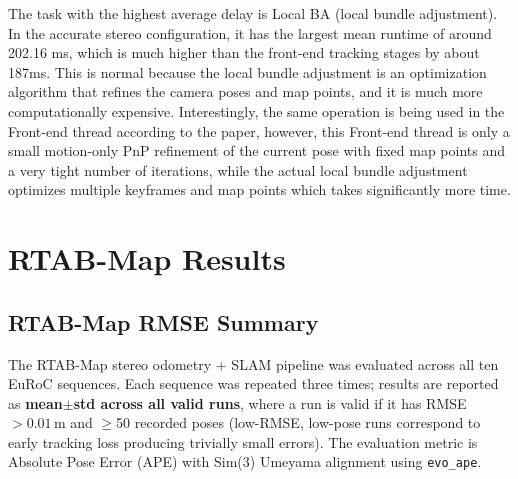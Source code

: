 \documentclass[11pt]{article}
\begin{document}
The task with the highest average delay is Local BA (local bundle adjustment). In the accurate stereo configuration, it has the largest mean runtime of around 202.16 ms, which is much higher than the front-end tracking stages by about 187ms. This is normal because the local bundle adjustment is an optimization algorithm that refines the camera poses and map points, and it is much more computationally expensive. Interestingly, the same operation is being used in the Front-end thread according to the paper, however, this Front-end thread is only a small motion-only PnP refinement of the current pose with fixed map points and a very tight number of iterations, while the actual local bundle adjustment optimizes multiple keyframes and map points which takes significantly more time.
\clearpage

\section{RTAB-Map Results}

\subsection{RTAB-Map RMSE Summary}

The RTAB-Map stereo odometry + SLAM pipeline was evaluated across all ten EuRoC sequences. Each sequence was repeated three times; results are reported as \textbf{mean$\pm$std across all valid runs}, where a run is valid if it has RMSE $>0.01$\,m and $\geq$50 recorded poses (low-RMSE, low-pose runs correspond to early tracking loss producing trivially small errors). The evaluation metric is Absolute Pose Error (APE) with Sim(3) Umeyama alignment using \texttt{evo\_ape}.
\end{document}
